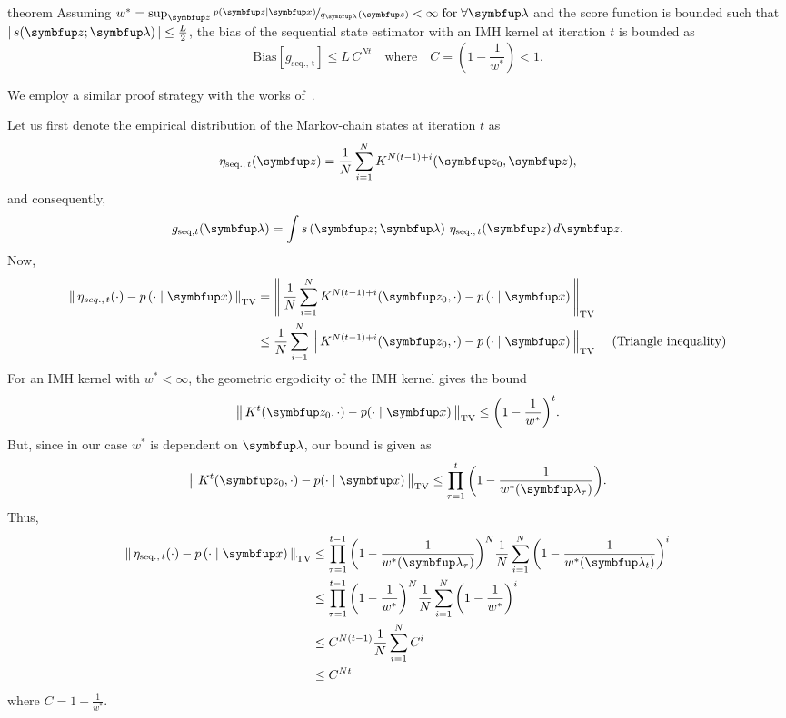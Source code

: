 
\begin{theoremEnd}{theorem}\label{thm:bias_seq}
  Assuming \(w^* = \sup_{\vz} \nicefrac{p\left(\vz\mid\vx\right)}{q_{\vlambda}\left(\vz\right)} < \infty\; \text{for} \; \forall \vlambda \) and the score function is bounded such that \(\left|\,s(\vz; \vlambda)\,\right| \leq \frac{L}{2}\), the bias of the sequential state estimator with an IMH kernel at iteration \(t\) is bounded as
  {\small
  \[
    \mathrm{Bias}\left[ g_{\mathrm{seq.,\, t}} \right] \leq L \, C^{N t} 
  \quad\text{where}\quad C = \left(1 - \frac{1}{w^*}\right) < 1.
  \]
  }
\end{theoremEnd}
%
\begin{proofEnd}
  We employ a similar proof strategy with the works of~\citet[Theorem 4]{jiang_mcmc_2021}.

  Let us first denote the empirical distribution of the Markov-chain states at iteration \(t\) as
  \begin{align}
    \eta_{\mathrm{seq.},\, t}(\vz) = \frac{1}{N} \sum_{i=1}^N K^{N (t-1) + i}(\vz_0, \vz),
  \end{align}
  and consequently,
  \begin{align}
      g_{\mathrm{seq}, t}(\vlambda) = \int s\left(\vz; \vlambda\right) \, \eta_{\mathrm{seq.},\, t}(\vz) \, d\vz.
  \end{align}
  Now,
  \begin{align}
    \DTV{ \eta_{seq.,\, t}(\cdot) }{p\left(\cdot\mid\vx\right)}
    &= \DTV{\frac{1}{N} \sum_{i=1}^N K^{N (t-1) + i}(\vz_0, \cdot)}{p\left(\cdot\mid\vx\right)} \\
    &\leq \frac{1}{N} \sum_{i=1}^N  \DTV{K^{N (t-1) + i}(\vz_0, \cdot)}{p\left(\cdot\mid\vx\right)} &\text{ (Triangle inequality)}
  \end{align}
 For an IMH kernel with \(w^* < \infty\), the geometric ergodicity of the IMH kernel \citep[Theorem 2.1]{10.2307/2242610} gives the bound
 \begin{align}
   \DTV{K^t(\vz_{0}, \cdot)}{p(\cdot\mid\vx)} \leq {\left(1 - \frac{1}{w^*}\right)}^t.
 \end{align}
 But, since in our case \(w^*\) is dependent on \(\vlambda\), our bound is given as
 \begin{align}
   \DTV{K^t(\vz_{0}, \cdot)}{p(\cdot\mid\vx)} \leq \prod_{\tau=1}^t {\left(1 - \frac{1}{w^*(\vlambda_{\tau})}\right)}.
 \end{align}
 Thus, 
  \begin{align}
    \DTV{ \eta_{\mathrm{seq.},\, t}(\cdot) }{p\left(\cdot\mid\vx\right)}
    &\leq  \prod_{\tau=1}^{t-1} {\left( 1 - \frac{1}{w^*(\vlambda_{\tau})} \right)}^N \frac{1}{N} \sum_{i=1}^N {\left( 1 - \frac{1}{w^*(\vlambda_{t})} \right)}^i \\
    &\leq  \prod_{\tau=1}^{t-1} {\left( 1 - \frac{1}{w^*} \right)}^N \frac{1}{N} \sum_{i=1}^N {\left( 1 - \frac{1}{w^*} \right)}^i \\
    &\leq C^{N (t-1)} \frac{1}{N} \sum_{i=1}^N C^i \\
    &\leq C^{N t}
  \end{align}
  where \(C = 1 - \frac{1}{w^*} \).


\end{proofEnd}
